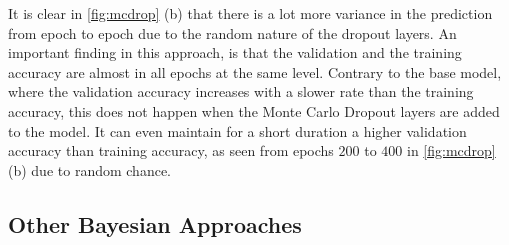 \documentclass[11pt,twoside]{article}
\numberwithin{Theorem}{section}
\numberwithin{Definition}{section}
\numberwithin{Lemma}{section}
\numberwithin{Algorithm}{section}
\numberwithin{equation}{section}
\begin{document}
It is clear in \autoref{fig:mcdrop} (b) that there is a lot more variance in the prediction from epoch to epoch due to the random nature of the dropout layers. An important finding in this approach, is that the validation and the training accuracy are almost in all epochs at the same level. Contrary to the base model, where the validation accuracy increases with a slower rate than the training accuracy, this does not happen when the Monte Carlo Dropout layers are added to the model. It can even maintain for a short duration a higher validation accuracy than training accuracy, as seen from epochs $200$ to $400$ in \autoref{fig:mcdrop} (b) due to random chance.

\subsection{Other Bayesian Approaches}
\label{sec:other}
\blindtext

\end{document}
